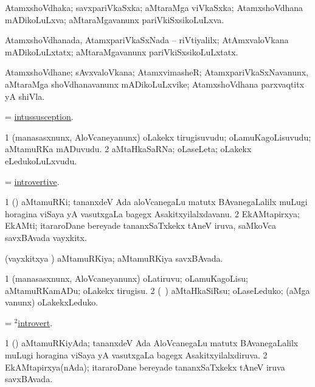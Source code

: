 \bentry
{}
\gl{\gu}
\bmng
AtamxshoVdhaka; savxpariVkaSxka; aMtaraMga viVkaSxka; AtamxshoVdhana mADikoLuLxva; aMtaraMgavanunx pariVkiSxsikoLuLxva. 
\emng
\eentry

\bentry
{}
\gl{\kirxvi}
\bmng
AtamxshoVdhanada, AtamxpariVkaSxNada -- riVtiyalilx; AtAmxvaloVkana mADikoLuLxtatx; aMtaraMgavanunx pariVkiSxsikoLuLxtatx. 
\emng
\eentry

\bentry
{}
\gl{\nA}
\bmng
AtamxshoVdhane; sAvxvaloVkana; AtamxvimasheR; AtamxpariVkaSxNavanunx, aMtaraMga shoVdhanavanunx mADikoLuLxvike; AtamxshoVdhana parxvaqtitx yA shiVla. 
\emng
\eentry

\bentry
{}
\gl{\nA}
\bmng
= \hyperlink{intussusception}{intussusception}. 
\emng
\eentry

\bentry
{}
\gl{\nA}
\bmng
\bnum
\num{1} (manasasxnunx, AloVcaneyanunx) oLakekx tirugisuvudu; oLamuKagoLisuvudu; aMtamuRKa mADuvudu. 
\num{2} aMtaHkaSaRNa; oLaseLeta; oLakekx eLedukoLuLxvudu. 
\enum
\emng
\eentry

\bentry
{}
\gl{\gu}
\bmng
= \hyperlink{introvertive}{introvertive}. 
\emng
\eentry

\bentry
{}
\gl{\nA}
\bmng
\bnum
\num{1} (\mashA) aMtamuRKi; tananxdeV Ada aloVcanegaLu matutx BAvanegaLalilx muLugi horagina viSaya yA vasutxgaLa bagegx Asakitxyilalxdavanu. 
\num{2} EkAMtapirxya; EkAMti; itararoDane bereyade tananxSaTxkekx tAneV iruva, saMkoVca savxBAvada vayxkitx. 
\enum
\emng
\eentry

\bentry
{}
\gl{\gu}
\bmng
(vayxkitxya \vi) aMtamuRKiya; aMtamuRKiya savxBAvada. 
\emng
\eentry

\bentry
{}
\gl{\sakirx}
\bmng
\bnum
\num{1} (manasasxnunx, AloVcaneyanunx) oLatiruvu; oLamuKagoLisu; aMtamuRKamADu; oLakekx tirugisu. 
\num{2} (\kanmu\ \pArxvi) aMtaHkaSiRsu; oLaseLeduko; (aMga \mo vanunx) oLakekxLeduko. 
\enum
\emng
\eentry

\bentry
{}
\gl{\gu}
\bmng
= \hyperlink{introvert(2)}{$^2$introvert}. 
\emng
\eentry

\bentry
{}
\gl{\gu}
\bmng
\bnum
\num{1} (\mashA) aMtamuRKiyAda; tananxdeV Ada AloVcanegaLu matutx BAvanegaLalilx muLugi horagina viSaya yA vasutxgaLa bagegx Asakitxyilalxdiruva. 
\num{2} EkAMtapirxya(nAda); itararoDane bereyade tananxSaTxkekx tAneV iruva savxBAvada. 
\enum
\emng
\eentry


